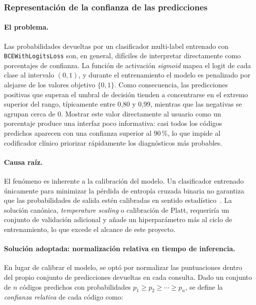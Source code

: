 \subsubsection{Representación de la confianza de las predicciones}
\label{sec:confianza-predicciones}

\paragraph{El problema.}
Las probabilidades devueltas por un clasificador multi-label entrenado con \texttt{BCEWithLogitsLoss} son, en general, difíciles de interpretar directamente como porcentajes de confianza. La función de activación \emph{sigmoid} mapea el logit de cada clase al intervalo $(0, 1)$, y durante el entrenamiento el modelo es penalizado por alejarse de los valores objetivo $\{0, 1\}$. Como consecuencia, las predicciones positivas que superan el umbral de decisión tienden a concentrarse en el extremo superior del rango, típicamente entre 0{,}80 y 0{,}99, mientras que las negativas se agrupan cerca de 0. Mostrar este valor directamente al usuario como un porcentaje produce una interfaz poco informativa: casi todos los códigos predichos aparecen con una confianza superior al 90\,\%, lo que impide al codificador clínico priorizar rápidamente los diagnósticos más probables.

\paragraph{Causa raíz.}
El fenómeno es inherente a la calibración del modelo. Un clasificador entrenado únicamente para minimizar la pérdida de entropía cruzada binaria no garantiza que las probabilidades de salida estén calibradas en sentido estadístico~\cite{Guo17}. La solución canónica, \emph{temperature scaling} o calibración de Platt, requeriría un conjunto de validación adicional y añade un hiperparámetro más al ciclo de entrenamiento, lo que excede el alcance de este proyecto.

\paragraph{Solución adoptada: normalización relativa en tiempo de inferencia.}
En lugar de calibrar el modelo, se optó por normalizar las puntuaciones dentro del propio conjunto de predicciones devueltas en cada consulta. Dado un conjunto de $n$ códigos predichos con probabilidades $p_1 \geq p_2 \geq \cdots \geq p_n$, se define la \emph{confianza relativa} de cada código como:

